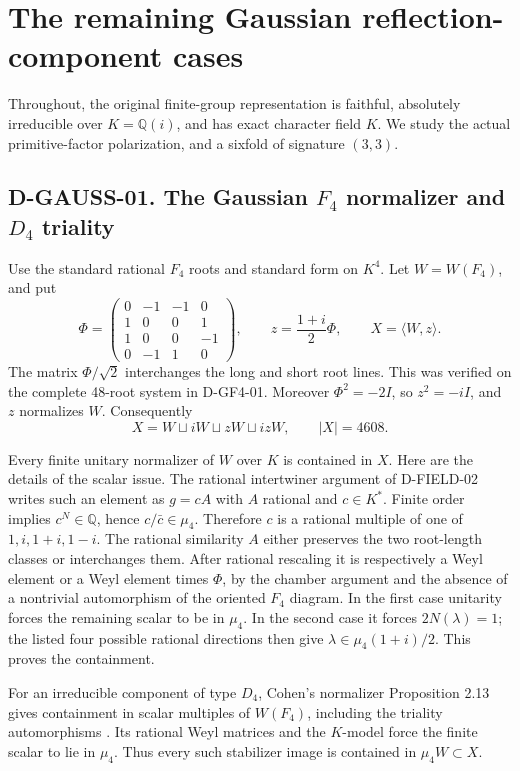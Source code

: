 \section{The remaining Gaussian reflection-component cases}
\label{sec:gaussian-reflection-reduction}

Throughout, the original finite-group representation is faithful,
absolutely irreducible over \(K=\mathbb Q(i)\), and has exact
character field \(K\). We study the actual primitive-factor
polarization, and a sixfold of signature \((3,3)\).

\subsection*{D-GAUSS-01. The Gaussian \(F_4\) normalizer and \(D_4\) triality}

Use the standard rational \(F_4\) roots and standard form on \(K^4\).
Let \(W=W(F_4)\), and put
\[
 \Phi=\begin{pmatrix}0&-1&-1&0\\1&0&0&1\\1&0&0&-1\\0&-1&1&0\end{pmatrix},
 \qquad z=\frac{1+i}{2}\Phi,\qquad X=\langle W,z\rangle.
\]
The matrix \(\Phi/\sqrt2\) interchanges the long and short root
lines. This was verified on the complete 48-root system in D-GF4-01.
Moreover \(\Phi^2=-2I\), so \(z^2=-iI\), and \(z\) normalizes
\(W\). Consequently
\[
       X=W\sqcup iW\sqcup zW\sqcup izW,\qquad |X|=4608.
\]

Every finite unitary normalizer of \(W\) over \(K\) is contained
in \(X\). Here are the details of the scalar issue. The rational
intertwiner argument of D-FIELD-02 writes such an element as \(g=cA\)
with \(A\) rational and \(c\in K^*\). Finite order implies
\(c^N\in\mathbb Q\), hence \(c/\bar c\in\mu_4\).
Therefore \(c\) is a rational multiple of one of
\(1,i,1+i,1-i\). The rational similarity \(A\) either preserves
the two root-length classes or interchanges them. After rational
rescaling it is respectively a Weyl element or a Weyl element times
\(\Phi\), by the chamber argument and the absence of a nontrivial
automorphism of the oriented \(F_4\) diagram. In the first case
unitarity forces the remaining scalar to be in \(\mu_4\). In the
second case it forces \(2N(\lambda)=1\); the listed four possible
rational directions then give
\(\lambda\in\mu_4(1+i)/2\). This proves the containment.

For an irreducible component of type \(D_4\), Cohen's normalizer
Proposition 2.13 gives containment in scalar multiples of \(W(F_4)\),
including the triality automorphisms
\cite[\S2.13, pp.~391--392]{FIELD:Cohen}. Its rational Weyl matrices
and the \(K\)-model force the finite scalar to lie in \(\mu_4\).
Thus every such stabilizer image is contained in \(\mu_4W\subset X\).

